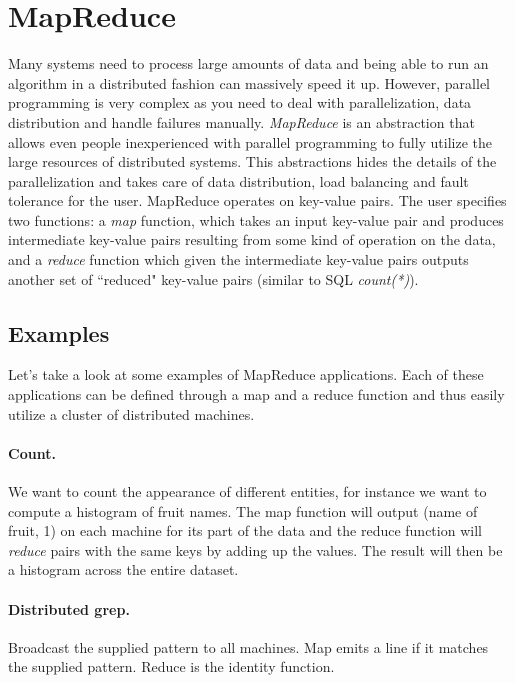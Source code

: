 \section{MapReduce}
\bigskip

Many systems need to process large amounts of data and being able to run an algorithm in a distributed fashion can massively speed it up. However, parallel programming is very complex as you need to deal with parallelization, data distribution and handle failures manually. \emph{MapReduce} is an abstraction that allows even people inexperienced with parallel programming to fully utilize the large resources of distributed systems. This abstractions hides the details of the parallelization and takes care of data distribution, load balancing and fault tolerance for the user. MapReduce operates on key-value pairs. The user specifies two functions: a \emph{map} function, which takes an input key-value pair and produces intermediate key-value pairs resulting from some kind of operation on the data, and a \emph{reduce} function which given the intermediate key-value pairs outputs another set of ``reduced" key-value pairs (similar to SQL \emph{count(*)}).

\subsection{Examples}
\bigskip

Let's take a look at some examples of MapReduce applications. Each of these applications can be defined through a map and a reduce function and thus easily utilize a cluster of distributed machines.

\paragraph{Count.}
We want to count the appearance of different entities, for instance we want to compute a histogram of fruit names. The map function will output (name of fruit, 1) on each machine for its part of the data and the reduce function will \emph{reduce} pairs with the same keys by adding up the values. The result will then be a histogram across the entire dataset.

\paragraph{Distributed grep.}
Broadcast the supplied pattern to all machines. Map emits a line if it matches the supplied pattern. Reduce is the identity function.

